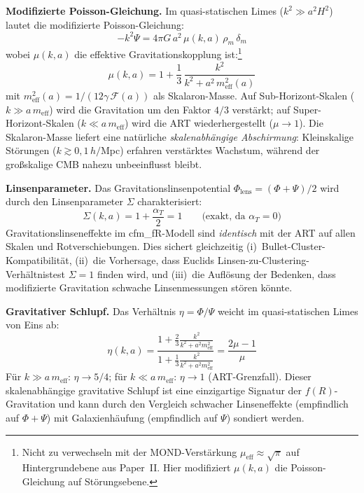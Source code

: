 \documentclass[11pt,a4paper]{article}
\begin{document}
\textbf{Modifizierte Poisson-Gleichung.} Im quasi-statischen Limes ($k^2 \gg a^2 H^2$) lautet die modifizierte Poisson-Gleichung:
\begin{equation}
-k^2 \Psi = 4\pi G\,a^2\,\mu(k,a)\,\rho_m\,\delta_m
\label{eq:modified_poisson}
\end{equation}
wobei $\mu(k,a)$ die effektive Gravitationskopplung ist:\footnote{\hypertarget{Hfootnote.2}{}Nicht zu verwechseln mit der MOND-Verst\"arkung $\mu_{\mathrm{eff}} \approx \sqrt{\pi}$ auf Hintergrundebene aus Paper~II. Hier modifiziert $\mu(k,a)$ die Poisson-Gleichung auf St\"orungsebene.}
\begin{equation}
{\mu(k,a) = 1 + \frac{1}{3}\,\frac{k^2}{k^2 + a^2\,m_{\mathrm{eff}}^2(a)}}
\label{eq:mu_ka}
\end{equation}
mit $m_{\mathrm{eff}}^2(a) = 1/(12\gamma\,\mathcal{F}(a))$ als Skalaron-Masse. Auf Sub-Horizont-Skalen ($k \gg a\,m_{\mathrm{eff}}$) wird die Gravitation um den Faktor $4/3$ verst\"arkt; auf Super-Horizont-Skalen ($k \ll a\,m_{\mathrm{eff}}$) wird die ART wiederhergestellt ($\mu \to 1$). Die Skalaron-Masse liefert eine nat\"urliche \textit{skalenabh\"angige Abschirmung}: Kleinskalige St\"orungen ($k \gtrsim 0{,}1\,h/$Mpc) erfahren verst\"arktes Wachstum, w\"ahrend der gro\ss skalige CMB nahezu unbeeinflusst bleibt.

\textbf{Linsenparameter.} Das Gravitationslinsenpotential $\Phi_{\mathrm{lens}} = (\Phi + \Psi)/2$ wird durch den Linsenparameter $\Sigma$ charakterisiert:
\begin{equation}
{\Sigma(k,a) = 1 + \frac{\alpha_T}{2} = 1 \qquad \text{(exakt, da $\alpha_T = 0$)}}
\label{eq:sigma_lensing}
\end{equation}
Gravitationslinseneffekte im cfm\_fR-Modell sind \textit{identisch} mit der ART auf allen Skalen und Rotverschiebungen. Dies sichert gleichzeitig (i)~Bullet-Cluster-Kompatibilit\"at, (ii)~die Vorhersage, dass Euclids Linsen-zu-Clustering-Verh\"altnistest $\Sigma = 1$ finden wird, und (iii)~die Aufl\"osung der Bedenken, dass modifizierte Gravitation schwache Linsenmessungen st\"oren k\"onnte.

\textbf{Gravitativer Schlupf.} Das Verh\"altnis $\eta = \Phi/\Psi$ weicht im quasi-statischen Limes von Eins ab:
\begin{equation}
\eta(k,a) = \frac{1 + \frac{2}{3}\frac{k^2}{k^2 + a^2 m_{\mathrm{eff}}^2}}{1 + \frac{1}{3}\frac{k^2}{k^2 + a^2 m_{\mathrm{eff}}^2}} = \frac{2\mu - 1}{\mu}
\end{equation}
F\"ur $k \gg a\,m_{\mathrm{eff}}$: $\eta \to 5/4$; f\"ur $k \ll a\,m_{\mathrm{eff}}$: $\eta \to 1$ (ART-Grenzfall). Dieser skalenabh\"angige gravitative Schlupf ist eine einzigartige Signatur der $f(R)$-Gravitation und kann durch den Vergleich schwacher Linseneffekte (empfindlich auf $\Phi + \Psi$) mit Galaxienh\"aufung (empfindlich auf $\Psi$) sondiert werden.
\end{document}
